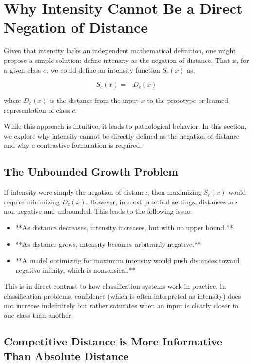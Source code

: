 \section{Why Intensity Cannot Be a Direct Negation of Distance}

Given that intensity lacks an independent mathematical definition, one might propose a simple solution: define intensity as the negation of distance. That is, for a given class \( c \), we could define an intensity function \( S_c(x) \) as:

\[
S_c(x) = -D_c(x)
\]

where \( D_c(x) \) is the distance from the input \( x \) to the prototype or learned representation of class \( c \). 

While this approach is intuitive, it leads to pathological behavior. In this section, we explore why intensity cannot be directly defined as the negation of distance and why a contrastive formulation is required.

\subsection{The Unbounded Growth Problem}

If intensity were simply the negation of distance, then maximizing \( S_c(x) \) would require minimizing \( D_c(x) \). However, in most practical settings, distances are non-negative and unbounded. This leads to the following issue:

\begin{itemize}
    \item **As distance decreases, intensity increases, but with no upper bound.**
    \item **As distance grows, intensity becomes arbitrarily negative.**
    \item **A model optimizing for maximum intensity would push distances toward negative infinity, which is nonsensical.**
\end{itemize}

This is in direct contrast to how classification systems work in practice. In classification problems, confidence (which is often interpreted as intensity) does not increase indefinitely but rather saturates when an input is clearly closer to one class than another.

\subsection{Competitive Distance is More Informative Than Absolute Distance}

